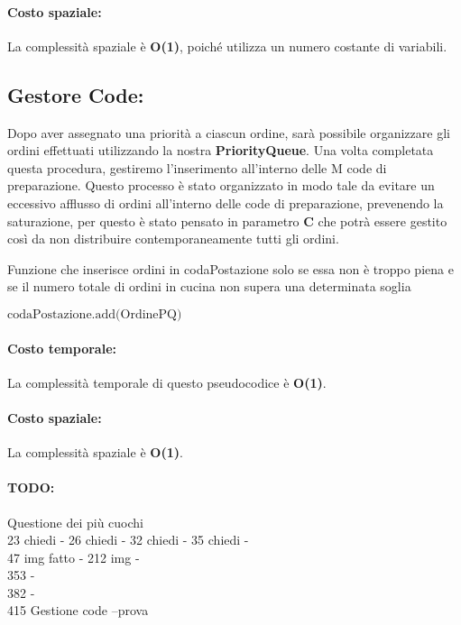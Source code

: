 \paragraph{Costo spaziale:}
La complessità spaziale è \textbf{O(1)}, poiché utilizza un numero costante di variabili.

\subsection{Gestore Code:}
Dopo aver assegnato una priorità a ciascun ordine, sarà possibile organizzare gli ordini effettuati utilizzando la nostra \textbf{PriorityQueue}. Una volta completata questa procedura, gestiremo l'inserimento all'interno delle M code di preparazione. Questo processo è stato organizzato in modo tale da evitare un eccessivo afflusso di ordini all'interno delle code di preparazione, prevenendo la saturazione, per questo è stato pensato in parametro \textbf{C} che potrà essere gestito così da non distribuire contemporaneamente tutti gli ordini.

\begin{algorithm}[h]
	\begin{algorithmic}[h!]
		\caption{Funzione che inserisce ordini in codaPostazione solo se essa non è troppo piena e se il numero totale di ordini in cucina non supera una determinata soglia}
		\State $\text{codaPostazione.add(OrdinePQ)}$
		\EndIf
		\EndProcedure
	\end{algorithmic}
\end{algorithm}

\paragraph{Costo temporale:}
La complessità temporale di questo pseudocodice è \textbf{O(1)}.

\paragraph{Costo spaziale:}
La complessità spaziale è \textbf{O(1)}.

\paragraph{TODO:}

Questione dei più cuochi\\
23 chiedi -
26  chiedi -
32  chiedi -
35  chiedi -\\
47 img fatto -
212 img -\\
353 -\\
382 -\\
415 Gestione code --prova

\clearpage